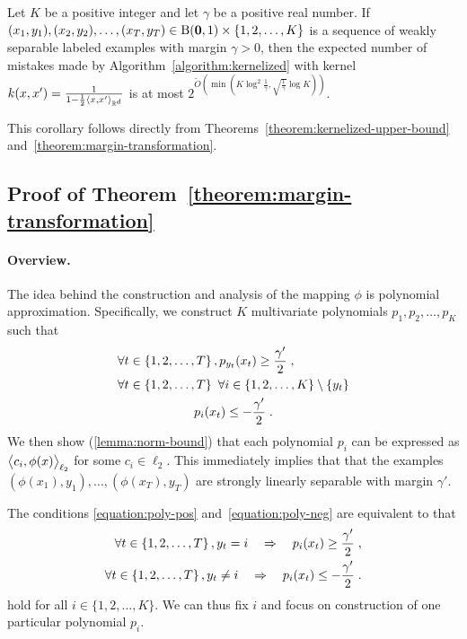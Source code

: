 \begin{corollary}
\label{corollary:weakly-separable-examples-mistake-upper-bound}
Let $K$ be a positive integer and let $\gamma$ be a positive real number. If
$(x_1, y_1), (x_2, y_2), \dots, (x_T, y_T) \in \operatorname{B}(\mathbf{0},1) \times \{1,2,\dots,K\}$
is a sequence of weakly separable labeled examples with margin $\gamma > 0$,
then the expected number of mistakes made by Algorithm~\ref{algorithm:kernelized}
with kernel $k(x,x') = \frac{1}{1 - \frac{1}{2}\left\langle x, x' \right\rangle_{\mathbb{R}^d}}$
is at most $2^{\widetilde{O}(\min(K \log^2 \frac{1}{\gamma},
\sqrt{\frac{1}{\gamma}} \log K))}$.
\end{corollary}

This corollary follows directly from
Theorems~\ref{theorem:kernelized-upper-bound}
and~\ref{theorem:margin-transformation}.

\subsection{Proof of Theorem~\ref{theorem:margin-transformation}}
\label{section:margin-transformation}

\paragraph{Overview.} The idea behind the construction and analysis of the
mapping $\phi$ is polynomial approximation. Specifically, we construct $K$
multivariate polynomials $p_1, p_2, \dots,p_K$ such that
\begin{align}
\label{equation:poly-pos}
& \forall t \in \cbr{1,2,\dots,T}, p_{y_t}(x_t) \ge \frac{\gamma'}{2} \; ,
\\
\label{equation:poly-neg}
& \begin{gathered}
\forall t \in \cbr{1,2,\dots,T} \ \forall i \in \cbr{1,2,\ldots,K} \setminus \cbr{y_t} \\
p_i(x_t) \le - \frac{\gamma'}{2} \; .
\end{gathered}
\end{align}
We then show (\autoref{lemma:norm-bound}) that each polynomial $p_i$ can be
expressed as $\left\langle c_i, \phi(x) \right\rangle_{\ell_2}$ for some $c_i \in \ell_2$. This
immediately implies that that the examples $(\phi(x_1),y_1), \ldots,
(\phi(x_T),y_T)$ are strongly linearly separable with margin $\gamma'$.

The conditions \eqref{equation:poly-pos} and~\eqref{equation:poly-neg} are
equivalent to that
\begin{align}
\label{equation:poly-pos-i}
\forall t \in \cbr{1,2,\dots,T}, y_t = i \quad \Rightarrow \quad p_i(x_t) \ge \frac{\gamma'}{2} \; , \\
\label{equation:poly-neg-i}
\forall t \in \cbr{1,2,\dots,T}, y_t \neq i \quad \Rightarrow \quad p_i(x_t) \le -\frac{\gamma'}{2} \; .
\end{align}
hold for all $i \in \{1,2,\dots,K\}$. We can thus fix $i$ and focus on
construction of one particular polynomial $p_i$.

